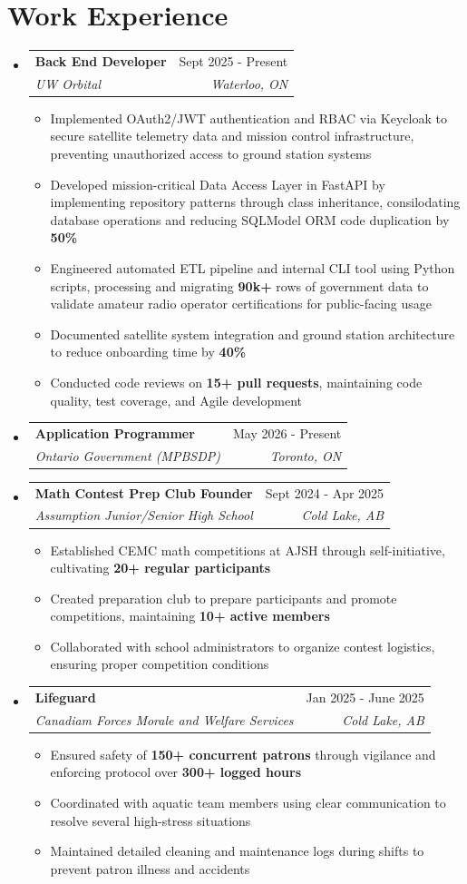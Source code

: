 \documentclass[letterpaper,11pt]{article}
\makeatletter
\newcommand{\resumeItem}[1]{
  \item\small{
    {#1 \vspace{-2pt}}
  }
}
\newcommand{\resumeSubheading}[4]{
  \vspace{-2pt}\item
    \begin{tabular*}{0.97\textwidth}[t]{l@{\extracolsep{\fill}}r}
      \textbf{#1} & #2 \\
      \textit{\small#3} & \textit{\small #4} \\
    \end{tabular*}\vspace{-7pt}
}
\newcommand{\resumeSubHeadingListStart}{\begin{itemize}[leftmargin=0.15in, label={}]}
\newcommand{\resumeSubHeadingListEnd}{\end{itemize}}
\newcommand{\resumeItemListStart}{\begin{itemize}}
\newcommand{\resumeItemListEnd}{\end{itemize}\vspace{-5pt}}
\makeatother
\begin{document}
\section{Work Experience}
  \resumeSubHeadingListStart
\resumeSubheading
      {Back End Developer}{Sept 2025 - Present}
      {UW Orbital}{Waterloo, ON}
\resumeItemListStart
\resumeItem{Implemented OAuth2/JWT authentication and RBAC via Keycloak to secure satellite telemetry data and mission control infrastructure, preventing unauthorized access to ground station systems}
\resumeItem{Developed mission-critical Data Access Layer in FastAPI by implementing repository patterns through class inheritance, consilodating database operations and reducing SQLModel ORM code duplication by \textbf{50\%}}
\resumeItem{Engineered automated ETL pipeline and internal CLI tool using Python scripts, processing and migrating \textbf{90k+} rows of government data to validate amateur radio operator certifications for public-facing usage}
\resumeItem{Documented satellite system integration and ground station architecture to reduce onboarding time by \textbf{40\%}}
\resumeItem{Conducted code reviews on \textbf{15+ pull requests}, maintaining code quality, test coverage, and Agile development}
\resumeItemListEnd
\resumeSubheading
      {Application Programmer}{May 2026 - Present}
      {Ontario Government (MPBSDP)}{Toronto, ON}
\resumeSubheading
      {Math Contest Prep Club Founder}{Sept 2024 - Apr 2025}
      {Assumption Junior/Senior High School}{Cold Lake, AB}
\resumeItemListStart
\resumeItem{Established CEMC math competitions at AJSH through self-initiative, cultivating \textbf{20+ regular participants}}
\resumeItem{Created preparation club to prepare participants and promote competitions, maintaining \textbf{10+ active members}}
\resumeItem{Collaborated with school administrators to organize contest logistics, ensuring proper competition conditions}
\resumeItemListEnd
\resumeSubheading
      {Lifeguard}{Jan 2025 - June 2025}
      {Canadiam Forces Morale and Welfare Services}{Cold Lake, AB}
\resumeItemListStart
\resumeItem{Ensured safety of \textbf{150+ concurrent patrons} through vigilance and enforcing protocol over \textbf{300+ logged hours}}
\resumeItem{Coordinated with aquatic team members using clear communication to resolve several high-stress situations}
\resumeItem{Maintained detailed cleaning and maintenance logs during shifts to prevent patron illness and accidents}
\resumeItemListEnd
\resumeSubHeadingListEnd%
\end{document}
